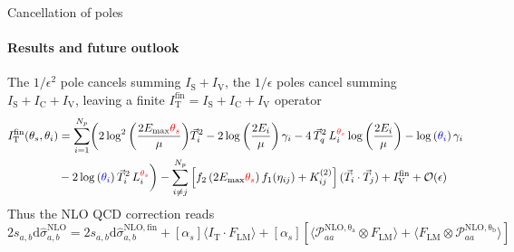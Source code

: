 \begin{frame} {Cancellation of poles}
  \framesubtitle{Results and future outlook}
The $1/\epsilon^2$ pole cancels summing $I_{\mathrm{S}}+I_{\mathrm{V}}$, the $1/\epsilon$ poles cancel summing $I_{\mathrm{S}}+I_{\mathrm{C}}+I_{\mathrm{V}}$, leaving a finite $I_{\mathrm{T}}^{\mathrm{fin}}=I_{\mathrm{S}}+I_{\mathrm{C}}+I_{\mathrm{V}}$ operator
 \begin{equation*}
 \begin{aligned}
     I_{\mathrm{T}}^{\mathrm{fin}}(\theta_s,\theta_i) & = \sum_{i=1}^{N_p} \biggl(2 \log^2{\left(\frac{2 E_{\mathrm{max}}\textcolor{red}{\theta_s}}{\mu} \right)}\vec{T}_i^2  - 2 \log{\left(\frac{2E_i}{\mu}\right)}\, \gamma_i - 4 \, \vec{T}_q^2 \, L_i^{\textcolor{red}{\theta_s}} \log{\left(\frac{2E_i}{\mu}\right)} - \log{(\textcolor{blue}{\theta_i})} \, \gamma_i \\
     & - 2 \log{(\textcolor{blue}{\theta_i})} \, \vec{T}_i^2 \, L_i^{\textcolor{red}{\theta_s}} \biggr) - \sum_{i\neq j}^{N_p} \left[ f_2 \left(2 E_{\mathrm{max}}\textcolor{red}{\theta_s}\right) f_1(\eta_{ij}) + K_{ij}^{(2)}\right] (\vec{T}_i \cdot \vec{T}_j) + I_{\mathrm{V}}^{\mathrm{fin}} +\mathcal{O}(\epsilon)
 \end{aligned}
 \end{equation*}
Thus the NLO QCD correction reads
\begin{equation*}
    2s_{a,b} \mathrm{d}\hat{\sigma}_{a,b}^{\mathrm{NLO}} = 2s_{a,b} \mathrm{d}\hat{\sigma}_{a,b}^{\mathrm{NLO, fin}} + [\alpha_s] \langle I_{\mathrm{T}}\cdot F_{\mathrm{LM}} \rangle + [\alpha_s]\left[\langle \mathcal{P}_{aa}^{\mathrm{NLO, \theta_a}}\otimes F_{\mathrm{LM}}\rangle+\langle F_{\mathrm{LM}}\otimes \mathcal{P}_{aa}^{\mathrm{NLO, \theta_b}}\rangle \right]
\end{equation*}

\end{frame}



